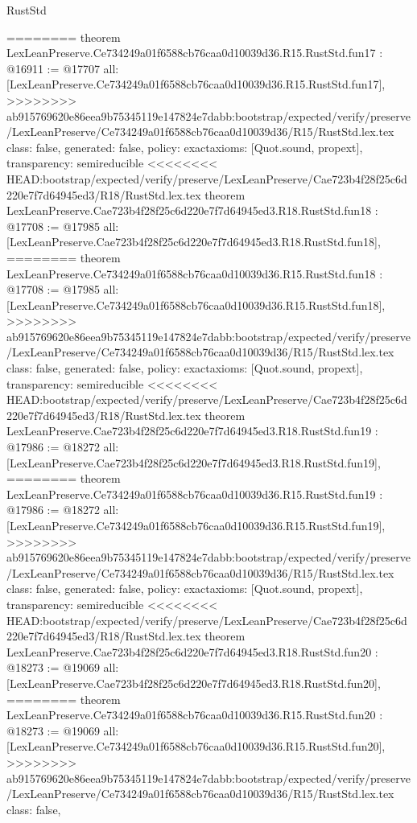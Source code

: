 \begin{lexlean}{RustStd}
\begin{coremodule}
{\begin{coremodule}
{{{{{{{{{{{{{{{{{{{{========
theorem LexLeanPreserve.Ce734249a01f6588cb76caa0d10039d36.R15.RustStd.fun17 : @16911 := @17707 {
  all: [LexLeanPreserve.Ce734249a01f6588cb76caa0d10039d36.R15.RustStd.fun17],
>>>>>>>> ab915769620e86eea9b75345119e147824e7dabb:bootstrap/expected/verify/preserve/LexLeanPreserve/Ce734249a01f6588cb76caa0d10039d36/R15/RustStd.lex.tex
  class: false,
  generated: false,
  policy: exact{axioms: [Quot.sound, propext]},
  transparency: semireducible
}
<<<<<<<< HEAD:bootstrap/expected/verify/preserve/LexLeanPreserve/Cae723b4f28f25c6d220e7f7d64945ed3/R18/RustStd.lex.tex
theorem LexLeanPreserve.Cae723b4f28f25c6d220e7f7d64945ed3.R18.RustStd.fun18 : @17708 := @17985 {
  all: [LexLeanPreserve.Cae723b4f28f25c6d220e7f7d64945ed3.R18.RustStd.fun18],
========
theorem LexLeanPreserve.Ce734249a01f6588cb76caa0d10039d36.R15.RustStd.fun18 : @17708 := @17985 {
  all: [LexLeanPreserve.Ce734249a01f6588cb76caa0d10039d36.R15.RustStd.fun18],
>>>>>>>> ab915769620e86eea9b75345119e147824e7dabb:bootstrap/expected/verify/preserve/LexLeanPreserve/Ce734249a01f6588cb76caa0d10039d36/R15/RustStd.lex.tex
  class: false,
  generated: false,
  policy: exact{axioms: [Quot.sound, propext]},
  transparency: semireducible
}
<<<<<<<< HEAD:bootstrap/expected/verify/preserve/LexLeanPreserve/Cae723b4f28f25c6d220e7f7d64945ed3/R18/RustStd.lex.tex
theorem LexLeanPreserve.Cae723b4f28f25c6d220e7f7d64945ed3.R18.RustStd.fun19 : @17986 := @18272 {
  all: [LexLeanPreserve.Cae723b4f28f25c6d220e7f7d64945ed3.R18.RustStd.fun19],
========
theorem LexLeanPreserve.Ce734249a01f6588cb76caa0d10039d36.R15.RustStd.fun19 : @17986 := @18272 {
  all: [LexLeanPreserve.Ce734249a01f6588cb76caa0d10039d36.R15.RustStd.fun19],
>>>>>>>> ab915769620e86eea9b75345119e147824e7dabb:bootstrap/expected/verify/preserve/LexLeanPreserve/Ce734249a01f6588cb76caa0d10039d36/R15/RustStd.lex.tex
  class: false,
  generated: false,
  policy: exact{axioms: [Quot.sound, propext]},
  transparency: semireducible
}
<<<<<<<< HEAD:bootstrap/expected/verify/preserve/LexLeanPreserve/Cae723b4f28f25c6d220e7f7d64945ed3/R18/RustStd.lex.tex
theorem LexLeanPreserve.Cae723b4f28f25c6d220e7f7d64945ed3.R18.RustStd.fun20 : @18273 := @19069 {
  all: [LexLeanPreserve.Cae723b4f28f25c6d220e7f7d64945ed3.R18.RustStd.fun20],
========
theorem LexLeanPreserve.Ce734249a01f6588cb76caa0d10039d36.R15.RustStd.fun20 : @18273 := @19069 {
  all: [LexLeanPreserve.Ce734249a01f6588cb76caa0d10039d36.R15.RustStd.fun20],
>>>>>>>> ab915769620e86eea9b75345119e147824e7dabb:bootstrap/expected/verify/preserve/LexLeanPreserve/Ce734249a01f6588cb76caa0d10039d36/R15/RustStd.lex.tex
  class: false,
}}}}}}}}}}}}}}}}}}}}}}}}
\end{coremodule}}
\end{coremodule}
\end{lexlean}
